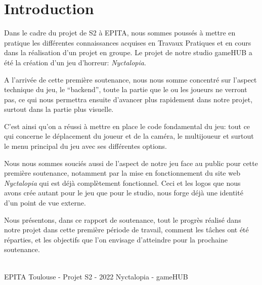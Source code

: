 \section{Introduction}
\setlength{\parindent}{5ex}
Dans le cadre du projet de S2 à EPITA, nous sommes poussés à mettre en pratique les différentes connaissances acquises en Travaux Pratiques et en cours dans la réalisation d'un projet en groupe.
Le projet de notre studio gameHUB a été la création d'un jeu d'horreur: \emph{Nyctalopia}.


A l'arrivée de cette première soutenance, nous nous somme concentré sur l'aspect technique du jeu, le ``backend'', toute la partie que le ou les joueurs ne verront pas, ce qui nous permettra ensuite d'avancer plus rapidement dans notre projet, surtout dans la partie plus visuelle.

C'est ainsi qu'on a réussi à mettre en place le code fondamental du jeu: tout ce qui concerne le déplacement du joueur et de la caméra, le multijoueur et surtout le menu principal du jeu avec ses différentes options.

Nous nous sommes souciés aussi de l'aspect de notre jeu face au public pour cette première soutenance, notamment par la mise en fonctionnement du site web \emph{Nyctalopia} qui est déjà complètement fonctionnel. Ceci et les logos que nous avons crée autant pour le jeu que pour le studio, nous forge déjà une identité d'un point de vue externe.

Nous présentons, dans ce rapport de soutenance, tout le progrès réalisé dans notre projet dans cette première période de travail, comment les tâches ont été réparties, et les objectifs que l'on envisage d'atteindre pour la prochaine soutenance.

\vfill
\noindent\makebox[\linewidth]{\rule{.8\paperwidth}{.6pt}}\\[0.2cm]
EPITA Toulouse - Projet S2 - 2022 \hfill Nyctalopia - gameHUB
\noindent\makebox[\linewidth]{\rule{.8\paperwidth}{.6pt}}

\newpage